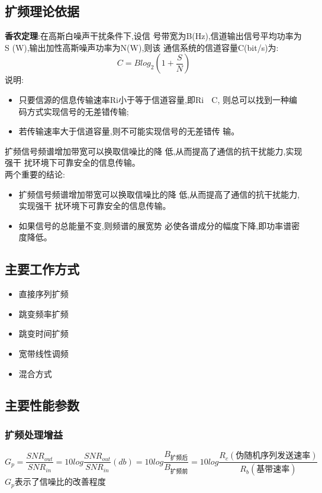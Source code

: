 \subsection{扩频理论依据}
\textbf{香农定理}:在高斯白噪声干扰条件下,设信
号带宽为B(Hz),信道输出信号平均功率为S
(W),输出加性高斯噪声功率为N(W),则该
通信系统的信道容量C(bit/s)为:
\begin{equation}\label{key}
C = Blog_2(1+\frac{S}{N})
\end{equation}
说明:
\begin{itemize}
	\item 只要信源的信息传输速率Ri小于等于信道容量,即Ri  C,
	则总可以找到一种编码方式实现信号的无差错传输;
	\item 若传输速率大于信道容量,则不可能实现信号的无差错传
	输。
\end{itemize}
扩频信号频谱增加带宽可以换取信噪比的降
低,从而提高了通信的抗干扰能力,实现强干
扰环境下可靠安全的信息传输。\\
两个重要的结论:
\begin{itemize}
	\item 扩频信号频谱增加带宽可以换取信噪比的降
	低,从而提高了通信的抗干扰能力,实现强干
	扰环境下可靠安全的信息传输。
	\item 如果信号的总能量不变,则频谱的展宽势
	必使各谱成分的幅度下降,即功率谱密度降低。
	
\end{itemize}
\subsection{主要工作方式}
\begin{itemize}
	\item 直接序列扩频
	\item 跳变频率扩频
	\item 跳变时间扩频
	\item 宽带线性调频
	\item 混合方式
\end{itemize}
\subsection{主要性能参数}
\subsubsection{扩频处理增益}
\begin{equation}\label{key}
G_p = \frac{SNR_{out}}{SNR_{in}} =10log\frac{SNR_{out}}{SNR_{in}} (db)=  10log\frac{B_{\text{扩频后}}}{B_{\text{扩频前}}} =10log \frac{R_c(\text{伪随机序列发送速率})}{R_b(\text{基带速率})}
\end{equation}
$ G_p $表示了信噪比的改善程度
